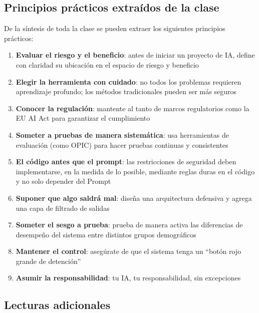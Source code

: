 \documentclass[a4paper]{article}
\begin{document}
\subsection{Principios prácticos extraídos de la clase}

De la síntesis de toda la clase se pueden extraer los siguientes principios prácticos:

\begin{enumerate}
    \item \textbf{Evaluar el riesgo y el beneficio}: antes de iniciar un proyecto de IA, define con claridad su ubicación en el espacio de riesgo y beneficio
    \item \textbf{Elegir la herramienta con cuidado}: no todos los problemas requieren aprendizaje profundo; los métodos tradicionales pueden ser más seguros
    \item \textbf{Conocer la regulación}: mantente al tanto de marcos regulatorios como la EU AI Act para garantizar el cumplimiento
    \item \textbf{Someter a pruebas de manera sistemática}: usa herramientas de evaluación (como OPIC) para hacer pruebas continuas y consistentes
    \item \textbf{El código antes que el prompt}: las restricciones de seguridad deben implementarse, en la medida de lo posible, mediante reglas duras en el código y no solo depender del Prompt
    \item \textbf{Suponer que algo saldrá mal}: diseña una arquitectura defensiva y agrega una capa de filtrado de salidas
    \item \textbf{Someter el sesgo a prueba}: prueba de manera activa las diferencias de desempeño del sistema entre distintos grupos demográficos
    \item \textbf{Mantener el control}: asegúrate de que el sistema tenga un ``botón rojo grande de detención''
    \item \textbf{Asumir la responsabilidad}: tu IA, tu responsabilidad, sin excepciones
\end{enumerate}

\subsection{Lecturas adicionales}
\end{document}
